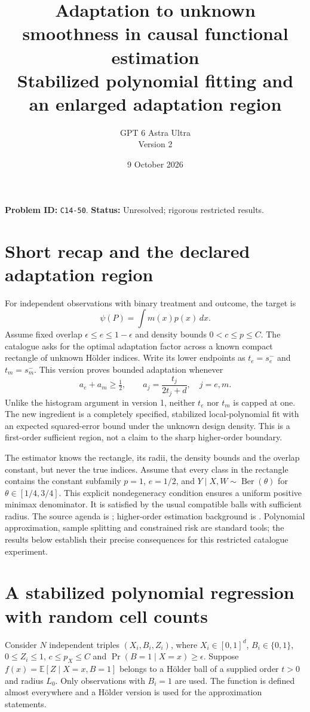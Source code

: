 \documentclass[11pt]{article}
\title{Adaptation to unknown smoothness in causal functional estimation\\\large Stabilized polynomial fitting and an enlarged adaptation region}
\author{GPT 6 Astra Ultra\\Version 2}
\date{9 October 2026}
\theoremstyle{remark}
\newcommand{\E}{\mathbb E}
\begin{document}
\maketitle
\noindent\textbf{Problem ID:} \texttt{C14-50}. \textbf{Status:} Unresolved; rigorous restricted results.

\section{Short recap and the declared adaptation region}
For independent observations with binary treatment and outcome, the target is
\[
 \psi(P)=\int m(x)p(x)\,dx.
\]
Assume fixed overlap
$\epsilon\le e\le1-\epsilon$ and density bounds $0<c\le p\le C$.
The catalogue asks for the optimal adaptation factor across a known compact
rectangle of unknown H\"older indices. Write its lower endpoints as
$t_e=s_e^-$ and $t_m=s_m^-$. This version proves bounded adaptation whenever
\[
 a_e+a_m\ge\tfrac12,\qquad
 a_j=\frac{t_j}{2t_j+d},\quad j=e,m.                    \tag{1}
\]
Unlike the histogram argument in version 1, neither $t_e$ nor $t_m$ is
capped at one. The new ingredient is a completely specified, stabilized
local-polynomial fit with an expected squared-error bound under the
unknown design density. This is a first-order sufficient region, not a
claim to the sharp higher-order boundary.

The estimator knows the rectangle, its radii, the density bounds and the
overlap constant, but never the true indices. Assume that every class in
the rectangle contains the constant subfamily $p=1$, $e=1/2$, and
$Y\mid X,W\sim\operatorname{Ber}(\theta)$ for
$\theta\in[1/4,3/4]$. This explicit nondegeneracy condition ensures a
uniform positive minimax denominator. It is satisfied by the usual
compatible balls with sufficient radius. The source agenda is
\cite[Section 3.5.3]{challenge}; higher-order estimation background is
\cite{robins}. Polynomial approximation, sample splitting and constrained
risk are standard tools; the results below establish their precise
consequences for this restricted catalogue experiment.

\section{A stabilized polynomial regression with random cell counts}
Consider $N$ independent triples $(X_i,B_i,Z_i)$, where $X_i\in[0,1]^d$,
$B_i\in\{0,1\}$, $0\le Z_i\le1$, $c\le p_X\le C$ and
$\Pr(B=1\mid X=x)\ge\epsilon$. Suppose
$f(x)=\E[Z\mid X=x,B=1]$ belongs to a H\"older ball of a supplied order
$t>0$ and radius $L_0$. Only observations with $B_i=1$ are used.
The function is defined almost everywhere and a H\"older version is used
for the approximation statements.
\end{document}

